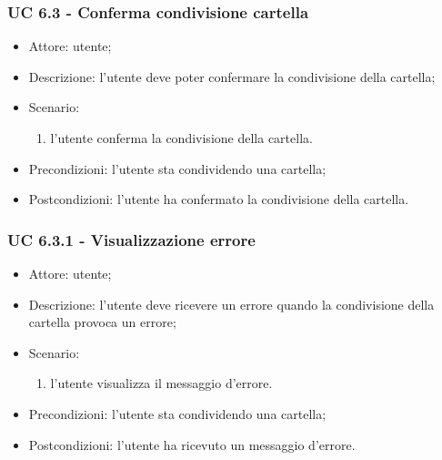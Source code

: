     \subsubsection{UC 6.3 - Conferma condivisione cartella} \label{sec: UC 6.3}
    \begin{itemize}
        \item Attore: utente;
        \item Descrizione: l'utente deve poter confermare la condivisione della cartella;
        \item Scenario:
        \begin{enumerate}
        \item l'utente conferma la condivisione della cartella.
        \end{enumerate}
        \item Precondizioni: l'utente sta condividendo una cartella;
        \item Postcondizioni: l'utente ha confermato la condivisione della cartella.
    \end{itemize}

    \subsubsection{UC 6.3.1 - Visualizzazione errore } \label{sec: UC 6.3.1}
    \begin{itemize}
        \item Attore: utente;
        \item Descrizione: l'utente deve ricevere un errore quando la condivisione della cartella provoca un errore;
        \item Scenario:
        \begin{enumerate}
        \item l'utente visualizza il messaggio d'errore.
        \end{enumerate}   
        \item Precondizioni: l'utente sta condividendo una cartella;
        \item Postcondizioni: l'utente ha ricevuto un messaggio d'errore.
    \end{itemize}

